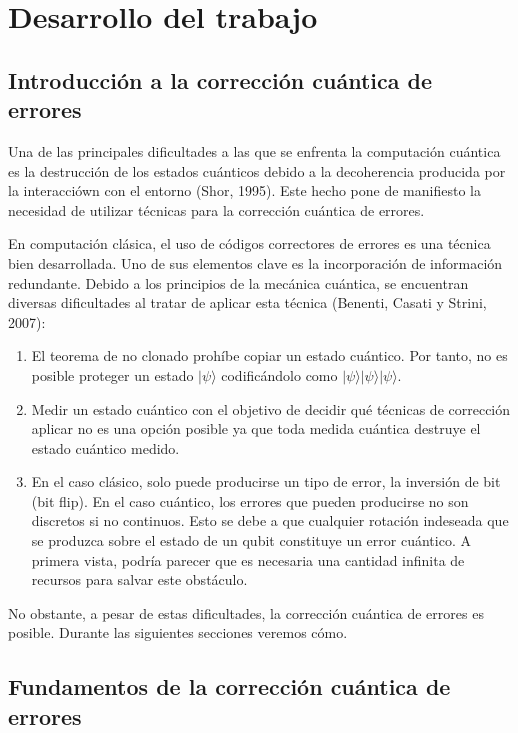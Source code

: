\chapter{Desarrollo del trabajo}

\section{Introducción a la corrección cuántica de errores}

Una de las principales dificultades a las que se enfrenta la computación cuántica es la destrucción de los estados cuánticos debido a la decoherencia producida por la interacciówn con el entorno (Shor, 1995). Este hecho pone de manifiesto la necesidad de utilizar técnicas para la corrección cuántica de errores.

En computación clásica, el uso de códigos correctores de errores es una técnica bien desarrollada. Uno de sus elementos clave es la incorporación de información redundante. Debido a los principios de la mecánica cuántica, se encuentran diversas dificultades al tratar de aplicar esta técnica (Benenti, Casati y Strini, 2007):
\begin{enumerate}
    \item El teorema de no clonado prohíbe copiar un estado cuántico. Por tanto, no es posible proteger un estado $ | \psi \rangle $ codificándolo como $| \psi \rangle | \psi \rangle | \psi \rangle $.
    \item Medir un estado cuántico con el objetivo de decidir qué técnicas de corrección aplicar no es una opción posible ya que toda medida cuántica destruye el estado cuántico medido.
    \item En el caso clásico, solo puede producirse un tipo de error, la inversión de bit (bit flip). En el caso cuántico, los errores que pueden producirse no son discretos si no continuos. Esto se debe a que cualquier rotación indeseada que se produzca sobre el estado de un qubit constituye un error cuántico. A primera vista, podría parecer que es necesaria una cantidad infinita de recursos para salvar este obstáculo.
\end{enumerate}

No obstante, a pesar de estas dificultades, la corrección cuántica de errores es posible. Durante las siguientes secciones veremos cómo.

\section{Fundamentos de la corrección cuántica de errores}

